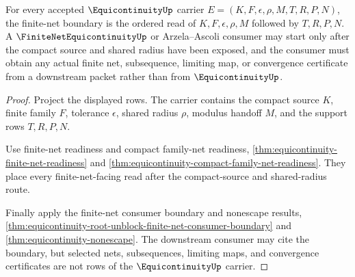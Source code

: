 \begin{theorem}
\label{thm:equicontinuity-root-unblock-finite-net-boundary}
For every accepted $\EquicontinuityUp$ carrier $E=(K,F,\epsilon,\rho,M,T,R,P,N)$, the finite-net boundary is the ordered read of $K,F,\epsilon,\rho,M$ followed by $T,R,P,N$. A $\FiniteNetEquicontinuityUp$ or Arzela--Ascoli consumer may start only after the compact source and shared radius have been exposed, and the consumer must obtain any actual finite net, subsequence, limiting map, or convergence certificate from a downstream packet rather than from $\EquicontinuityUp$.
\end{theorem}
\begin{proof}
Project the displayed rows. The carrier contains the compact source $K$, finite family $F$, tolerance $\epsilon$, shared radius $\rho$, modulus handoff $M$, and the support rows $T,R,P,N$.

Use finite-net readiness and compact family-net readiness, \autoref{thm:equicontinuity-finite-net-readiness} and \autoref{thm:equicontinuity-compact-family-net-readiness}. They place every finite-net-facing read after the compact-source and shared-radius route.

Finally apply the finite-net consumer boundary and nonescape results, \autoref{thm:equicontinuity-root-unblock-finite-net-consumer-boundary} and \autoref{thm:equicontinuity-nonescape}. The downstream consumer may cite the boundary, but selected nets, subsequences, limiting maps, and convergence certificates are not rows of the $\EquicontinuityUp$ carrier.
\end{proof}

